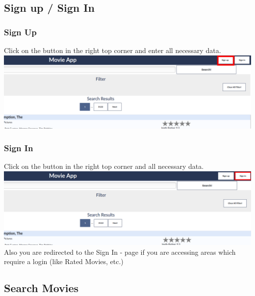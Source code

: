 \documentclass{article}
\begin{document}
\subsection{Sign up / Sign In}

\subsubsection*{Sign Up}

Click on the button in the right top corner and enter all necessary data.\\[2ex]
\includegraphics[scale=0.3]{screenshots_app/sign_up.png}\\

\subsubsection{Sign In}

Click on the button in the right top corner and all necessary data.\\[2ex]
\includegraphics[scale=0.3]{screenshots_app/sign_in.png}\\
Also you are redirected to the Sign In - page if you are accessing areas which require a login (like Rated Movies, etc.)


\subsection{Search Movies}
\end{document}
